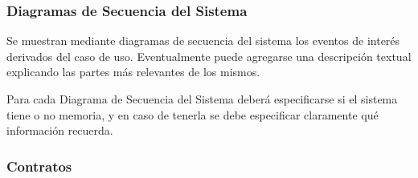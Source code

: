 \documentclass[10pt,spanish]{article}
\numberwithin{figure}{section} %
\begin{document}
\subsubsection{Diagramas de Secuencia del Sistema}
Se muestran mediante diagramas de secuencia del sistema los eventos de interés derivados del caso de uso. Eventualmente puede agregarse una descripción textual explicando las partes más relevantes de los mismos.


{\color{red} 
Para cada Diagrama de Secuencia del Sistema deberá especificarse si el sistema tiene o no memoria, y en caso de tenerla se debe especificar claramente qué información recuerda.
}

\subsubsection{Contratos}
\end{document}
